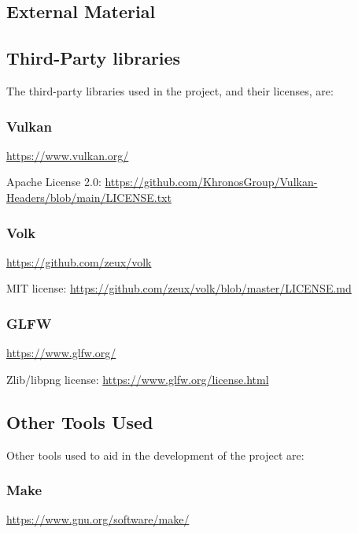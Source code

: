 \begin{appendices}

\chapter{External Material}

\section{Third-Party libraries}

The third-party libraries used in the project, and their licenses, are:

\subsection{Vulkan}

\url{https://www.vulkan.org/}\newline

Apache License 2.0: \url{https://github.com/KhronosGroup/Vulkan-Headers/blob/main/LICENSE.txt}

\subsection{Volk}

\url{https://github.com/zeux/volk}\newline

MIT license: \url{https://github.com/zeux/volk/blob/master/LICENSE.md}

\subsection{GLFW}

\url{https://www.glfw.org/}\newline

Zlib/libpng license: \url{https://www.glfw.org/license.html}

\section{Other Tools Used}

Other tools used to aid in the development of the project are:

\subsection{Make}

\url{https://www.gnu.org/software/make/}


\end{appendices}
